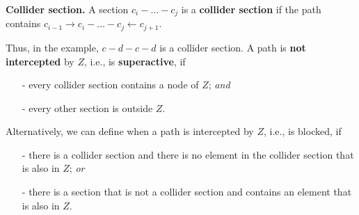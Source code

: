 \documentclass{article}
\begin{document}
\begin{theorem}
    \textbf{Collider section.} A section $c_i - \dots - c_j$ is a \textbf{collider section} if the path contains $c_{i-1} \rightarrow c_i - \dots - c_j \leftarrow c_{j+1}$. 
    
    \begin{center}
    \end{center}
\end{theorem}


\noindent Thus, in the example, $c - d - c - d$ is a collider section. A path is \textbf{not intercepted} by $Z$, i.e., is \textbf{superactive}, if 
\begin{itemize}
    \item[-] every collider section contains a node of $Z$; \textit{and}
    \item[-] every other section is outside $Z$.
\end{itemize}

\noindent Alternatively, we can define when a path is intercepted by $Z$, i.e., is blocked, if
\begin{itemize}
    \item[-] there is a collider section and there is no element in the collider section that is also in $Z$; \textit{or}
    \item[-] there is a section that is not a collider section and contains an element that is also in $Z$.
\end{itemize}
\end{document}

